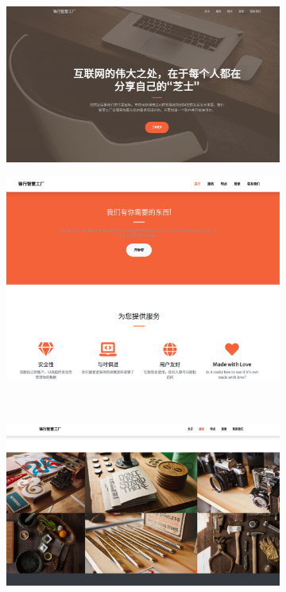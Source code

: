 \begin{figure}[H]
    \centering
    \begin{subfigure}{.45\textwidth}
        \centering
        \includegraphics[width=\textwidth]{figures/5index.png}
        \label{fig:index1}
    \end{subfigure}
    \qquad
    \begin{subfigure}{.45\textwidth}
        \centering
        \includegraphics[width=\textwidth]{figures/5index2.png}
        \label{fig:index2}
    \end{subfigure}
    \\
    \begin{subfigure}{.45\textwidth}
        \centering
        \includegraphics[width=\textwidth]{figures/5index3.png}

\end{subfigure}
\end{figure}
